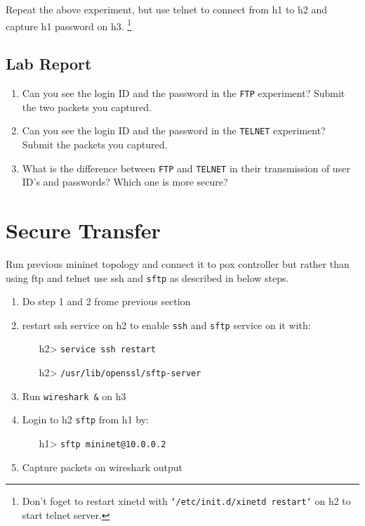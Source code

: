 \documentclass[10pt,a4paper]{article}
\numberwithin{equation}{section}
\numberwithin{figure}{section}
\numberwithin{table}{section}
\begin{document}
Repeat the above experiment, but use telnet to connect from h1 to h2 and capture h1 password on h3. \footnote{Don't foget to restart xinetd with \texttt{`/etc/init.d/xinetd restart`} on h2 to start telnet server. }

\subsection*{Lab Report}
\begin{enumerate}
	\setlength{\itemindent}{0pt}
	\item Can you see the login ID and the password in the \texttt{FTP} experiment? Submit the two packets you captured.
	\item Can you see the login ID and the password in the \texttt{TELNET} experiment? Submit the packets you captured.
	\item What is the difference between \texttt{FTP} and \texttt{TELNET} in their transmission of user ID’s and passwords? Which one is more secure?
\end{enumerate}

\section{Secure Transfer}
Run previous mininet topology and connect it to pox controller but rather than using ftp and telnet use ssh and \texttt{sftp} as described in below steps.

\begin{enumerate}
	\setlength{\itemindent}{10pt}
	\item Do step 1 and 2 frome previous section
	\item restart ssh service on h2 to enable \texttt{ssh} and \texttt{sftp} service on it with:
	\begin{enumerate}
		\setlength{\itemindent}{10pt}
		\item [h2>] \texttt{service ssh restart}
		\item [h2>] \texttt{/usr/lib/openssl/sftp-server}
	\end{enumerate}
	\item Run \texttt{wireshark \&} on h3
	\item Login to h2 \texttt{sftp} from h1 by:
	\begin{enumerate}
		\setlength{\itemindent}{10pt}
		\item [h1>] \texttt{sftp mininet@10.0.0.2}
	\end{enumerate}
	\item Capture packets on wireshark output
	
\end{enumerate}
\end{document}
